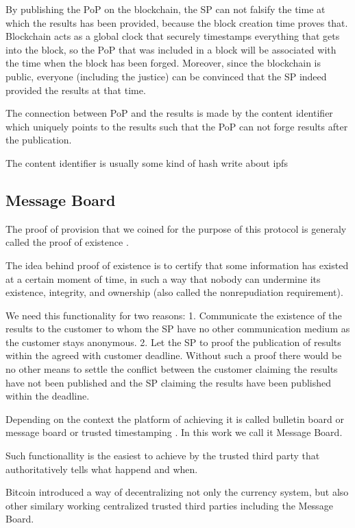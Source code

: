 \documentclass{ieeeaccess}
\begin{document}
By publishing the PoP on the blockchain, the SP can not falsify the time
at which the results has been provided, because the block creation time
proves that. Blockchain acts as a global clock that securely timestamps
everything that gets into the block, so the PoP that was included in a
block will be associated with the time when the block has been forged.
Moreover, since the blockchain is public, everyone (including the
justice) can be convinced that the SP indeed provided the results at
that time.

The connection between PoP and the results is made by the content
identifier which uniquely points to the results such that the PoP can
not forge results after the publication.

The content identifier is usually some kind of hash write about ipfs

\subsection{Message Board}\label{message-board}
The proof of provision that we coined for the purpose of this protocol
is generaly called the proof of existence
\cite{proofofexistence, de2016stampery, Chainpoi39}.

The idea behind proof of existence is to certify that some information
has existed at a certain moment of time, in such a way that nobody can
undermine its existence, integrity, and ownership (also called the
nonrepudiation requirement).

We need this functionality for two reasons: 1. Communicate the existence
of the results to the customer to whom the SP have no other
communication medium as the customer stays anonymous. 2. Let the SP to
proof the publication of results within the agreed with customer
deadline. Without such a proof there would be no other means to settle
the conflict between the customer claiming the results have not been
published and the SP claiming the results have been published within the
deadline.

Depending on the context the platform of achieving it is called bulletin
board \cite{achenbach2015improved} or message board
\cite{hinarejos2019solution} or trusted timestamping
\cite{gipp2015decentralized}. In this work we call it Message Board.

Such functionallity is the easiest to achieve by the trusted third party
that authoritatively tells what happend and when.

Bitcoin introduced a way of decentralizing not only the currency system,
but also other similary working centralized trusted third parties
including the Message Board.
\end{document}
